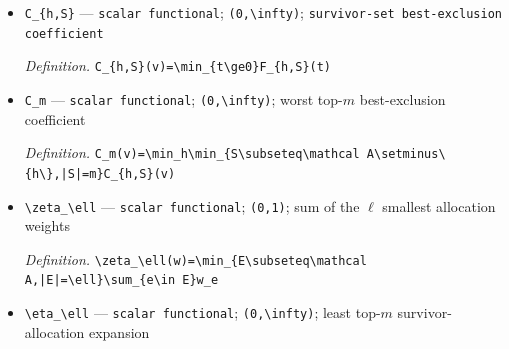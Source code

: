 \documentclass{article}
\begin{document}
\begin{itemize}
  \par\smallskip\noindent\emph{Definition.} \texttt{F\_\allowbreak{}\{h,\allowbreak{}S\}\allowbreak{}(t)=\allowbreak{}t\textasciicircum{}2/\allowbreak{}(2v\_\allowbreak{}h)+\allowbreak{}\textbackslash{}\allowbreak{}sum\_\allowbreak{}\{j\textbackslash{}\allowbreak{}in S\}\allowbreak{}(d\_\allowbreak{}\{hj\}\allowbreak{}-\allowbreak{}t)\_\allowbreak{}+\allowbreak{}\textasciicircum{}2/\allowbreak{}(2v\_\allowbreak{}j)}
  \item \texttt{C\_\allowbreak{}\{h,\allowbreak{}S\}\allowbreak{}} --- \texttt{scalar functional}; \texttt{(0,\allowbreak{}\textbackslash{}\allowbreak{}infty)}; \texttt{survivor-\allowbreak{}set best-\allowbreak{}exclusion coefficient}
  \par\smallskip\noindent\emph{Definition.} \texttt{C\_\allowbreak{}\{h,\allowbreak{}S\}\allowbreak{}(v)=\allowbreak{}\textbackslash{}\allowbreak{}min\_\allowbreak{}\{t\textbackslash{}\allowbreak{}ge0\}\allowbreak{}F\_\allowbreak{}\{h,\allowbreak{}S\}\allowbreak{}(t)}
  \item \texttt{C\_\allowbreak{}m} --- \texttt{scalar functional}; \texttt{(0,\allowbreak{}\textbackslash{}\allowbreak{}infty)}; worst top-\(m\) best-exclusion coefficient
  \par\smallskip\noindent\emph{Definition.} \texttt{C\_\allowbreak{}m(v)=\allowbreak{}\textbackslash{}\allowbreak{}min\_\allowbreak{}h\textbackslash{}\allowbreak{}min\_\allowbreak{}\{S\textbackslash{}\allowbreak{}subseteq\textbackslash{}\allowbreak{}mathcal A\textbackslash{}\allowbreak{}setminus\textbackslash{}\allowbreak{}\{h\textbackslash{}\allowbreak{}\}\allowbreak{},\allowbreak{}|S|=\allowbreak{}m\}\allowbreak{}C\_\allowbreak{}\{h,\allowbreak{}S\}\allowbreak{}(v)}
  \item \texttt{\textbackslash{}\allowbreak{}zeta\_\allowbreak{}\textbackslash{}\allowbreak{}ell} --- \texttt{scalar functional}; \texttt{(0,\allowbreak{}1)}; sum of the \(\ell\) smallest allocation weights
  \par\smallskip\noindent\emph{Definition.} \texttt{\textbackslash{}\allowbreak{}zeta\_\allowbreak{}\textbackslash{}\allowbreak{}ell(w)=\allowbreak{}\textbackslash{}\allowbreak{}min\_\allowbreak{}\{E\textbackslash{}\allowbreak{}subseteq\textbackslash{}\allowbreak{}mathcal A,\allowbreak{}|E|=\allowbreak{}\textbackslash{}\allowbreak{}ell\}\allowbreak{}\textbackslash{}\allowbreak{}sum\_\allowbreak{}\{e\textbackslash{}\allowbreak{}in E\}\allowbreak{}w\_\allowbreak{}e}
  \item \texttt{\textbackslash{}\allowbreak{}eta\_\allowbreak{}\textbackslash{}\allowbreak{}ell} --- \texttt{scalar functional}; \texttt{(0,\allowbreak{}\textbackslash{}\allowbreak{}infty)}; least top-\(m\) survivor-allocation expansion

\end{itemize}
\end{document}
